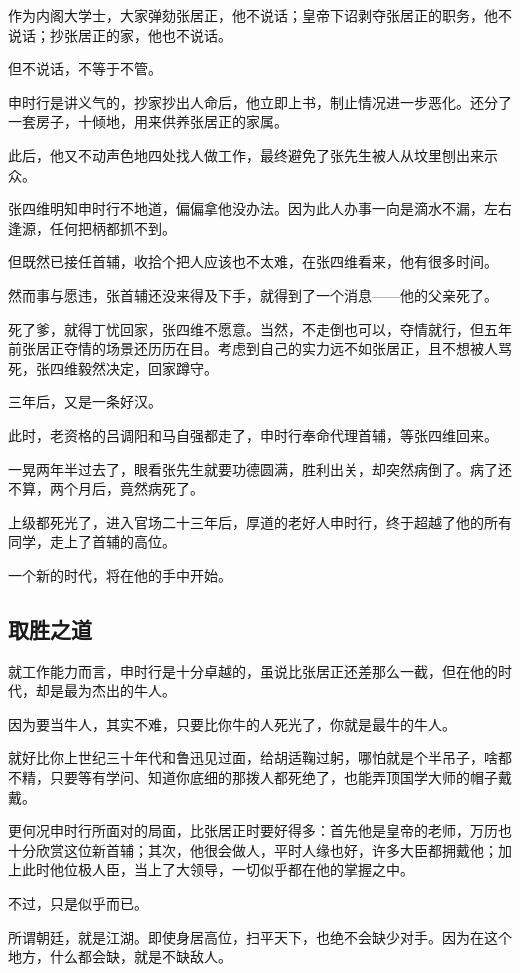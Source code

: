 \begin{multicols}{\theparacolNo}
作为内阁大学士，大家弹劾张居正，他不说话；皇帝下诏剥夺张居正的职务，他不说话；抄张居正的家，他也不说话。

但不说话，不等于不管。

申时行是讲义气的，抄家抄出人命后，他立即上书，制止情况进一步恶化。还分了一套房子，十倾地，用来供养张居正的家属。

此后，他又不动声色地四处找人做工作，最终避免了张先生被人从坟里刨出来示众。

张四维明知申时行不地道，偏偏拿他没办法。因为此人办事一向是滴水不漏，左右逢源，任何把柄都抓不到。

但既然已接任首辅，收拾个把人应该也不太难，在张四维看来，他有很多时间。

然而事与愿违，张首辅还没来得及下手，就得到了一个消息——他的父亲死了。

死了爹，就得丁忧回家，张四维不愿意。当然，不走倒也可以，夺情就行，但五年前张居正夺情的场景还历历在目。考虑到自己的实力远不如张居正，且不想被人骂死，张四维毅然决定，回家蹲守。

三年后，又是一条好汉。

此时，老资格的吕调阳和马自强都走了，申时行奉命代理首辅，等张四维回来。

一晃两年半过去了，眼看张先生就要功德圆满，胜利出关，却突然病倒了。病了还不算，两个月后，竟然病死了。

上级都死光了，进入官场二十三年后，厚道的老好人申时行，终于超越了他的所有同学，走上了首辅的高位。

一个新的时代，将在他的手中开始。

\subsection{取胜之道}
就工作能力而言，申时行是十分卓越的，虽说比张居正还差那么一截，但在他的时代，却是最为杰出的牛人。

因为要当牛人，其实不难，只要比你牛的人死光了，你就是最牛的牛人。

就好比你上世纪三十年代和鲁迅见过面，给胡适鞠过躬，哪怕就是个半吊子，啥都不精，只要等有学问、知道你底细的那拨人都死绝了，也能弄顶国学大师的帽子戴戴。

更何况申时行所面对的局面，比张居正时要好得多：首先他是皇帝的老师，万历也十分欣赏这位新首辅；其次，他很会做人，平时人缘也好，许多大臣都拥戴他；加上此时他位极人臣，当上了大领导，一切似乎都在他的掌握之中。

不过，只是似乎而已。

所谓朝廷，就是江湖。即使身居高位，扫平天下，也绝不会缺少对手。因为在这个地方，什么都会缺，就是不缺敌人。


\end{multicols}
